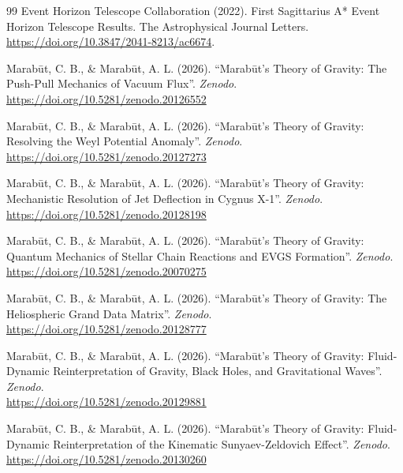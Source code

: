 \documentclass[11pt, a4paper]{article}
\begin{document}
\begin{thebibliography}{99}
  Event Horizon Telescope Collaboration (2022). First Sagittarius A* Event Horizon Telescope Results. The Astrophysical Journal Letters. \\ \url{https://doi.org/10.3847/2041-8213/ac6674}.

  Marab\={u}t, C. B., \& Marab\={u}t, A. L. (2026). ``Marab\={u}t's Theory of Gravity: The Push-Pull Mechanics of Vacuum Flux''. \textit{Zenodo}. \\
  \url{https://doi.org/10.5281/zenodo.20126552}

  Marab\={u}t, C. B., \& Marab\={u}t, A. L. (2026). ``Marab\={u}t's Theory of Gravity: Resolving the Weyl Potential Anomaly''. \textit{Zenodo}. \\
  \url{https://doi.org/10.5281/zenodo.20127273}

  Marab\={u}t, C. B., \& Marab\={u}t, A. L. (2026). ``Marab\={u}t's Theory of Gravity: Mechanistic Resolution of Jet Deflection in Cygnus X-1''. \textit{Zenodo}. \\
  \url{https://doi.org/10.5281/zenodo.20128198}

  Marab\={u}t, C. B., \& Marab\={u}t, A. L. (2026). ``Marab\={u}t's Theory of Gravity: Quantum Mechanics of Stellar Chain Reactions and EVGS Formation''. \textit{Zenodo}. \\
  \url{https://doi.org/10.5281/zenodo.20070275}

  Marab\={u}t, C. B., \& Marab\={u}t, A. L. (2026). ``Marab\={u}t's Theory of Gravity: The Heliospheric Grand Data Matrix''. \textit{Zenodo}. \\
  \url{https://doi.org/10.5281/zenodo.20128777}

  Marab\={u}t, C. B., \& Marab\={u}t, A. L. (2026). ``Marab\={u}t's Theory of Gravity: Fluid-Dynamic Reinterpretation of Gravity, Black Holes, and Gravitational Waves''. \textit{Zenodo}. \\
  \url{https://doi.org/10.5281/zenodo.20129881}

  Marab\={u}t, C. B., \& Marab\={u}t, A. L. (2026). ``Marab\={u}t's Theory of Gravity: Fluid-Dynamic Reinterpretation of the Kinematic Sunyaev-Zeldovich Effect''. \textit{Zenodo}. \\
  \url{https://doi.org/10.5281/zenodo.20130260}


\end{thebibliography}
\end{document}
